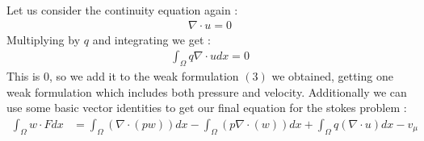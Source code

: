 \documentclass[11pt,twoside,a4paper]{article}
\begin{document}
Let us consider the continuity equation again :
\begin{align*}
\nabla \cdot u = 0
\end{align*}
Multiplying by $q$ and integrating we get :
\begin{align*}
\int_\Omega q \nabla \cdot u dx = 0
\end{align*}
This is $0$, so we add it to the weak formulation $(3)$ we obtained, getting one weak formulation which includes both pressure and velocity. 
Additionally we can use some basic vector identities to get our final equation for the stokes problem :
\begin{align}
\int_\Omega w \cdot F dx &= \int_\Omega (\nabla \cdot (p w)) dx - \int_\Omega ( p \nabla \cdot (w)) dx + \int_\Omega q (\nabla \cdot u) dx  - v_\mu
\end{align}
\end{document}
